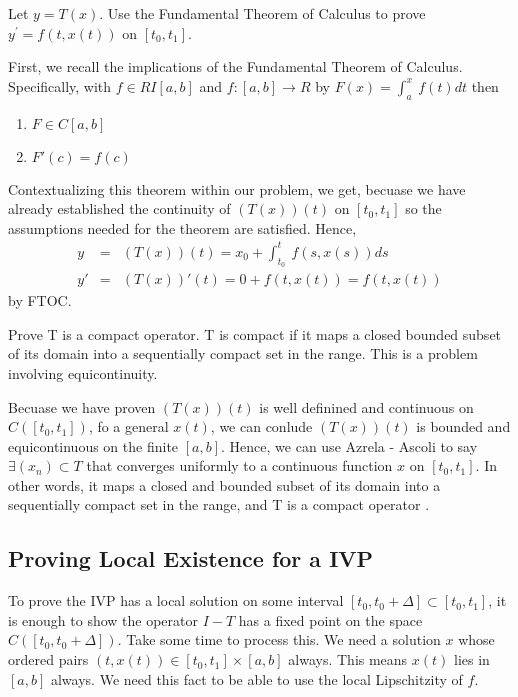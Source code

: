 \documentclass[11pt]{SelfArxOneColBMN}
\begin{document}
\begin{exercise}
Let $y = T(x)$.  Use the Fundamental Theorem of Calculus
to prove $y^\prime = f(t,x(t))$ on $[t_0,t_1]$.
\end{exercise}

\begin{solution}
First, we recall the implications of the Fundamental Theorem of Calculus. Specifically, with $f \in RI[a,b]$ and $f:[a,b] \rightarrow R$ by $F(x) = \int_a^x\:f(t)dt$ then
 \begin{enumerate}
   \item $F \in C[a,b]$
   \item $F'(c) = f(c)$
 \end{enumerate}
Contextualizing this theorem within our problem, we get, becuase we have already established the continuity of $(T(x))(t)$ on $[t_0,t_1]$ so the assumptions needed for the theorem are satisfied. Hence,
\begin{eqnarray*}
  y &=& (T(x))(t) = x_0 + \int_{t_0}^t\:f(s,x(s))ds\\
  y' &=& (T(x))'(t) = 0 + f(t,x(t)) = f(t,x(t))
\end{eqnarray*}
by FTOC.
\end{solution}

\begin{exercise}
Prove T is a compact operator. T is compact if it maps a closed bounded subset of its domain into a sequentially compact set in the range. This is a problem involving equicontinuity.
\end{exercise}

\begin{solution}
Becuase we have proven $(T(x))(t)$ is well definined and continuous on $C([t_0,t_1])$, fo a general $x(t)$, we can conlude $(T(x))(t)$ is bounded and equicontinuous on the finite $[a,b]$. Hence, we can use Azrela - Ascoli to say $\exists (x_n) \subset T$ that converges uniformly to a continuous function $x$ on $[t_0,t_1]$. In other words, it maps a closed and bounded subset of its domain into a sequentially compact set in the range, and T is a compact operator
.
\end{solution}

\subsection{Proving Local Existence for a IVP}

To prove the IVP has a local solution on some interval
$[t_0,t_0+\Delta] \subset [t_0,t_1]$, it is enough to show
the operator $I-T$ has a fixed point on the space $C([t_0,t_0+\Delta])$.
Take some time to process this.  We need a solution $x$ whose 
ordered pairs $(t,x(t)) \in [t_0,t_1] \times [a,b]$ always.  This means
$x(t)$ lies in $[a,b]$ always.  We need this fact to be able to use the
local Lipschitzity of $f$.\\
\end{document}
